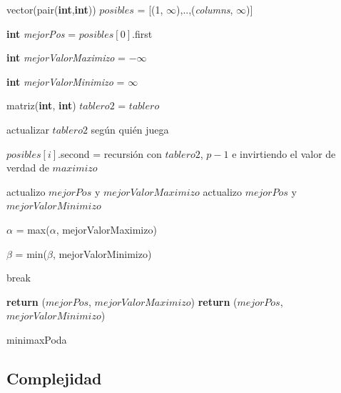 \documentclass[A4paper,oneside,fleqn,11pt]{article}
\theoremstyle{definition}
\begin{document}
\vspace{10mm}

\begin{algorithm}[H]


    
    vector(pair(\textbf{int},\textbf{int})) $posibles$ = [(1, $\infty$),..,(\textit{columns}, $\infty$)]
    
    \textbf{int} \textit{mejorPos} = $posibles[0]$.first
    
    \textbf{int} \textit{mejorValorMaximizo} = $-\infty$
    
    \textbf{int} \textit{mejorValorMinimizo} = $\infty$
    
    	{
    	matriz(\textbf{int}, \textbf{int}) $tablero2$ = $tablero$
    	
    	actualizar $tablero2$ según quién juega
    	
    	
    	$posibles[i]$.second = recursión con $tablero2$, $p-1$ e invirtiendo el valor de verdad de $maximizo$
    	
    		{
    		actualizo $mejorPos$ y $mejorValorMaximizo$
    		}
    		{
    		actualizo $mejorPos$ y $mejorValorMinimizo$
    		}
    		
    	$\alpha$ = max($\alpha$, mejorValorMaximizo)
    	
    	$\beta$ = min($\beta$, mejorValorMinimizo)
    	
    	\If{$\alpha$ $\geq$ $\beta$}
    		{
    		break
    		}
    	}
    	
		{    	
    	\textbf{return} ($mejorPos$, $mejorValorMaximizo$)
    	}
    	{
    	\textbf{return} ($mejorPos$, $mejorValorMinimizo$)
    	}
    
    \caption{minimaxPoda}

\end{algorithm}


\subsection{Complejidad}
\end{document}
